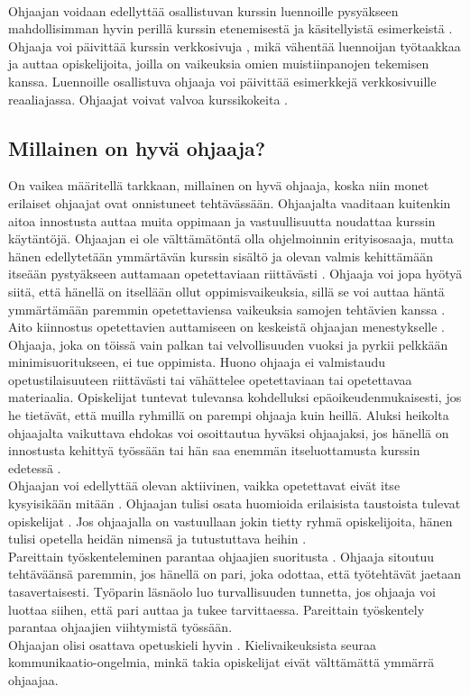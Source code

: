\documentclass[finnish]{tktltiki2}
\theoremstyle{definition}
\theoremstyle{remark}
\begin{document}
\\
Ohjaajan voidaan edellyttää osallistuvan kurssin luennoille pysyäkseen mahdollisimman hyvin perillä kurssin etenemisestä ja käsitellyistä esimerkeistä \cite{Reges03, Decker06}. Ohjaaja voi päivittää kurssin verkkosivuja \cite{Dickson11}, mikä vähentää luennoijan työtaakkaa ja auttaa opiskelijoita, joilla on vaikeuksia omien muistiinpanojen tekemisen kanssa. Luennoille osallistuva ohjaaja voi päivittää esimerkkejä verkkosivuille reaaliajassa. Ohjaajat voivat valvoa kurssikokeita \cite{Richards00}.



\subsection{Millainen on hyvä ohjaaja?}
On vaikea määritellä tarkkaan, millainen on hyvä ohjaaja, koska niin monet erilaiset ohjaajat ovat onnistuneet tehtävässään. Ohjaajalta vaaditaan kuitenkin aitoa innostusta auttaa muita oppimaan ja vastuullisuutta noudattaa kurssin käytäntöjä. Ohjaajan ei ole välttämätöntä olla ohjelmoinnin erityisosaaja, mutta hänen edellytetään ymmärtävän kurssin sisältö ja olevan valmis kehittämään itseään pystyäkseen auttamaan opetettaviaan riittävästi \cite{Reges88}. Ohjaaja voi jopa hyötyä siitä, että hänellä on itsellään ollut oppimisvaikeuksia, sillä se voi auttaa häntä ymmärtämään paremmin opetettaviensa vaikeuksia samojen tehtävien kanssa \cite{Decker06}.
\\
Aito kiinnostus opetettavien auttamiseen on keskeistä ohjaajan menestykselle \cite{Richards00}. Ohjaaja, joka on töissä vain palkan tai velvollisuuden vuoksi ja pyrkii pelkkään minimisuoritukseen, ei tue oppimista. Huono ohjaaja ei valmistaudu opetustilaisuuteen riittävästi tai vähättelee opetettaviaan tai opetettavaa materiaalia. Opiskelijat tuntevat tulevansa kohdelluksi epäoikeudenmukaisesti, jos he tietävät, että muilla ryhmillä on parempi ohjaaja kuin heillä. Aluksi heikolta ohjaajalta vaikuttava ehdokas voi osoittautua hyväksi ohjaajaksi, jos hänellä on innostusta kehittyä työssään tai hän saa enemmän itseluottamusta kurssin edetessä \cite{Dickson11}.
\\
Ohjaajan voi edellyttää olevan aktiivinen, vaikka opetettavat eivät itse kysyisikään mitään \cite{Vikberg}. Ohjaajan tulisi osata huomioida erilaisista taustoista tulevat opiskelijat \cite{Kay98}. Jos ohjaajalla on vastuullaan jokin tietty ryhmä opiskelijoita, hänen tulisi opetella heidän nimensä ja tutustuttava heihin \cite{Bernstein}.
\\
Pareittain työskenteleminen parantaa ohjaajien suoritusta \cite{Patitsas12_3}. Ohjaaja sitoutuu tehtäväänsä paremmin, jos hänellä on pari, joka odottaa, että työtehtävät jaetaan tasavertaisesti. Työparin läsnäolo luo turvallisuuden tunnetta, jos ohjaaja voi luottaa siihen, että pari auttaa ja tukee tarvittaessa. Pareittain työskentely parantaa ohjaajien viihtymistä työssään.
\\
Ohjaajan olisi osattava opetuskieli hyvin \cite{Richards00}. Kielivaikeuksista seuraa kom\-mu\-ni\-kaa\-tio-on\-gel\-mia, minkä takia opiskelijat eivät välttämättä ymmärrä ohjaajaa.
\end{document}
